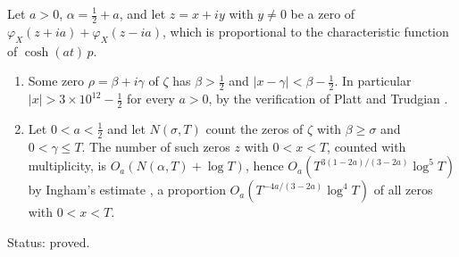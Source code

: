 \begin{proposition}\label{fm:prop:tiltfail}
Let $a>0$, $\alpha=\frac12+a$, and let $z=x+iy$ with $y\ne0$ be a zero of $\varphi_X(z+ia)+\varphi_X(z-ia)$, which is proportional to the characteristic function of $\cosh(at)\,p$.
\begin{enumerate}
\item[(i)] Some zero $\rho=\beta+i\gamma$ of $\zeta$ has $\beta>\frac12$ and $|x-\gamma|<\beta-\frac12$. In particular $|x|>3\times10^{12}-\frac12$ for every $a>0$, by the verification of Platt and Trudgian \cite{PT21}.
\item[(ii)] Let $0<a<\frac12$ and let $N(\sigma,T)$ count the zeros of $\zeta$ with $\beta\ge\sigma$ and $0<\gamma\le T$. The number of such zeros $z$ with $0<x<T$, counted with multiplicity, is $O_a(N(\alpha,T)+\log T)$, hence $O_a(T^{3(1-2a)/(3-2a)}\log^5T)$ by Ingham's estimate \cite{Ingham40}, a proportion $O_a(T^{-4a/(3-2a)}\log^4T)$ of all zeros with $0<x<T$.
\end{enumerate}
Status: proved.
\end{proposition}

